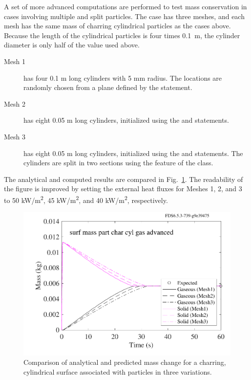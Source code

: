 \documentclass[11pt]{book}
\begin{document}
A set of more advanced computations are performed to test mass conservation in cases involving multiple and split particles.
The case has three meshes, and each mesh has the same mass of charring cylindrical particles as the cases above.
Because the length of the cylindrical particles is four times 0.1~m, the cylinder diameter is only half of the value used above.
\begin{description}
\item[Mesh 1] has four 0.1 m long cylinders with 5 mm radius. The locations are randomly chosen from a plane defined by the  statement.
\item[Mesh 2] has eight 0.05 m long cylinders, initialized using the  and  statements.
\item[Mesh 3] has eight 0.05 m long cylinders, initialized using the  and  statements. The cylinders are split in two sections using the
 feature of the  class.
\end{description}
The analytical and computed results are compared in Fig.~\ref{surf_mass_part_char_advanced}.
The readability of the figure is improved by setting the external heat fluxes for Meshes 1, 2, and 3 to 50 \si{kW/m^2}, 45 \si{kW/m^2}, and 40 \si{kW/m^2}, respectively.
\begin{figure}[ht]
\begin{center}
\includegraphics[width=4.5in]{SCRIPT_FIGURES/surf_mass_part_char_cyl_gas_advanced}
\end{center}
\caption[The  test cases]{Comparison of analytical and predicted mass change for a charring, cylindrical surface
associated with particles in three variations.}
\label{surf_mass_part_char_advanced}
\end{figure}
\end{document}
